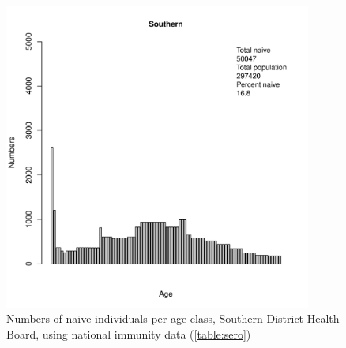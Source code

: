 \documentclass{article}
\begin{document}
\begin{figure}[H]
     \begin{center}
     \includegraphics[width=0.9\textwidth]{dhb20.pdf}
     \end{center}
     \caption{Numbers of na\"{\i}ve individuals per age class, Southern District Health Board, using national immunity data (\autoref{table:sero})}
     \label{fig:Southern}
\end{figure}
\end{document}
